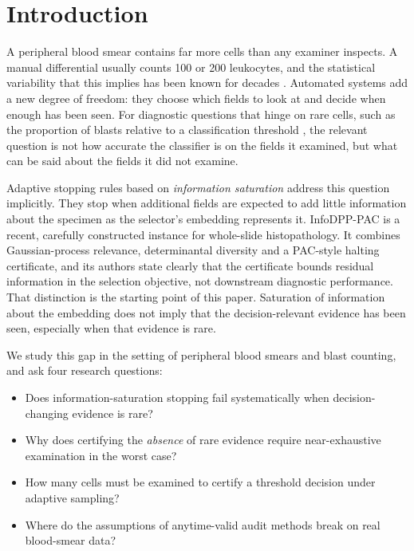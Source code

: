 \documentclass[11pt]{article}
\theoremstyle{remark}
\theoremstyle{definition}
\begin{document}
\section{Introduction}
A peripheral blood smear contains far more cells than any examiner inspects. A manual differential usually counts 100 or 200 leukocytes, and the statistical variability that this implies has been known for decades \cite{rumke1978}. Automated systems add a new degree of freedom: they choose which fields to look at and decide when enough has been seen. For diagnostic questions that hinge on rare cells, such as the proportion of blasts relative to a classification threshold \cite{khoury2022who,arber2022icc}, the relevant question is not how accurate the classifier is on the fields it examined, but what can be said about the fields it did not examine.

Adaptive stopping rules based on \emph{information saturation} address this question implicitly. They stop when additional fields are expected to add little information about the specimen as the selector's embedding represents it. InfoDPP-PAC \cite{mittal2026infodpp} is a recent, carefully constructed instance for whole-slide histopathology. It combines Gaussian-process relevance, determinantal diversity and a PAC-style halting certificate, and its authors state clearly that the certificate bounds residual information in the selection objective, not downstream diagnostic performance. That distinction is the starting point of this paper. Saturation of information about the embedding does not imply that the decision-relevant evidence has been seen, especially when that evidence is rare.

We study this gap in the setting of peripheral blood smears and blast counting, and ask four research questions:
\begin{itemize}
\item[\textbf{RQ1}] Does information-saturation stopping fail systematically when decision-changing evidence is rare?
\item[\textbf{RQ2}] Why does certifying the \emph{absence} of rare evidence require near-exhaustive examination in the worst case?
\item[\textbf{RQ3}] How many cells must be examined to certify a threshold decision under adaptive sampling?
\item[\textbf{RQ4}] Where do the assumptions of anytime-valid audit methods break on real blood-smear data?
\end{itemize}
\end{document}

